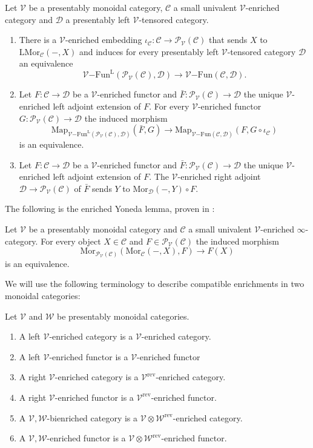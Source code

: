 \documentclass[10pt,oneside]{article}
\numberwithin{equation}{section} %
\numberwithin{figure}{section} %
\theoremstyle{plain}
\theoremstyle{definition}
\newcommand{\mC}{{\mathcal C}}
\newcommand{\mD}{{\mathcal D}}
\newcommand{\mP}{{\mathcal P}}
\newcommand{\mV}{{\mathcal V}}
\newcommand{\mW}{{\mathcal W}}
\renewcommand{\L}{{\mathrm L}}
\newcommand{\rev}{{\mathrm{rev}}}
\newcommand{\ot}{\otimes}
\newcommand{\Fun}{\mathrm{Fun}}
\newcommand{\Map}{{\mathrm{Map}}}
\newcommand{\Mor}{{\mathrm{Mor}}}
\begin{document}
\begin{theorem}
\label{Yonedaext}
Let $\mV$ be a presentably monoidal category, $\mC$ a small univalent $\mV$-enriched category and $\mD$ a presentably left $\mV$-tensored category.
\begin{enumerate}[\normalfont(1)]\setlength{\itemsep}{-2pt}
\item There is a $\mV$-enriched embedding $\iota_\mC : \mC \to \mP_\mV(\mC)$ that sends $X$ to $\L\Mor_\mC(-,X)$ and induces
for every presentably left $\mV$-tensored category $\mD$ an equivalence
$$ {\mV\mathrm{-}\Fun^\L}(\mP_\mV(\mC),\mD)\to \mV\mathrm{-}\Fun(\mC,\mD).$$
\item Let $F: \mC \to \mD$ be a $\mV$-enriched functor and
$\bar{F}: \mP_\mV(\mC) \to \mD $ the unique $\mV$-enriched left adjoint extension of $F$.
For every $\mV$-enriched functor $G: \mP_\mV(\mC) \to \mD $
the induced morphism $$\Map_{{\mV\mathrm{-}\Fun^\L}(\mP_\mV(\mC),\mD)}(\bar{F},G) \to \Map_{\mV\mathrm{-}\Fun(\mC,\mD)}(F,G \circ \iota_\mC) $$ is an equivalence.
\item Let $F: \mC \to \mD$ be a $\mV$-enriched functor and
$\bar{F}: \mP_\mV(\mC) \to \mD $ the unique $\mV$-enriched left adjoint extension of $F$.
The $\mV$-enriched right adjoint $\mD \to \mP_\mV(\mC)$ of $\bar{F}$ sends $Y$ to $\Mor_\mD(-,Y) \circ F. $
\end{enumerate}
\end{theorem}

The following is the enriched Yoneda lemma, proven in 
\cite[Corollary 4.44]{heine2024bienriched}:

\begin{lemma}
Let $\mV$ be a presentably monoidal category and $\mC$ a small univalent $\mV$-enriched $\infty$-category. For every object $X \in \mC$ and $F \in \mP_\mV(\mC)$ the induced morphism $$\Mor_{\mP_\mV(\mC)}(\Mor_\mC(-,X),F) \to F(X) $$ is an equivalence.

\end{lemma}

We will use the following terminology to describe compatible enrichments in two monoidal categories:

\begin{definition}\label{bienr}
Let $\mV$ and $\mW$ be presentably monoidal categories.	 
\begin{enumerate}[\normalfont(1)]\setlength{\itemsep}{-2pt}
\item A left $\mV$-enriched category is a $\mV$-enriched category.
\item A left $\mV$-enriched functor is a $\mV$-enriched functor
\item A right $\mV$-enriched category is a $\mV^\rev$-enriched category.
\item A right $\mV$-enriched functor is a $\mV^\rev$-enriched functor.
\item A $\mV,\mW$-bienriched category is a $\mV \ot \mW^\rev$-enriched category.
\item A $\mV,\mW$-enriched functor is a $\mV \ot \mW^\rev$-enriched functor.
\end{enumerate}
\end{definition}
\end{document}
